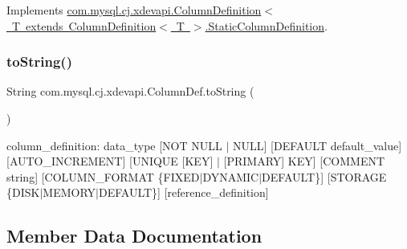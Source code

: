 Implements \mbox{\hyperlink{interfacecom_1_1mysql_1_1cj_1_1xdevapi_1_1_column_definition_1_1_static_column_definition_a0ac0436ab3288cb50a8dd10f4a9c8afc}{com.\+mysql.\+cj.\+xdevapi.\+Column\+Definition$<$ T extends Column\+Definition$<$ T $>$.\+Static\+Column\+Definition}}.

\mbox{\label{classcom_1_1mysql_1_1cj_1_1xdevapi_1_1_column_def_ae26162c5f6538de1eec31032e130593b}} 
\subsubsection{\texorpdfstring{to\+String()}{toString()}}
{\footnotesize\ttfamily String com.\+mysql.\+cj.\+xdevapi.\+Column\+Def.\+to\+String (\begin{DoxyParamCaption}{ }\end{DoxyParamCaption})}

column\+\_\+definition\+: data\+\_\+type \mbox{[}N\+OT N\+U\+LL $\vert$ N\+U\+LL\mbox{]} \mbox{[}D\+E\+F\+A\+U\+LT default\+\_\+value\mbox{]} \mbox{[}A\+U\+T\+O\+\_\+\+I\+N\+C\+R\+E\+M\+E\+NT\mbox{]} \mbox{[}U\+N\+I\+Q\+UE \mbox{[}K\+EY\mbox{]} $\vert$ \mbox{[}P\+R\+I\+M\+A\+RY\mbox{]} K\+EY\mbox{]} \mbox{[}C\+O\+M\+M\+E\+NT \textquotesingle{}string\textquotesingle{}\mbox{]} \mbox{[}C\+O\+L\+U\+M\+N\+\_\+\+F\+O\+R\+M\+AT \{F\+I\+X\+E\+D$\vert$\+D\+Y\+N\+A\+M\+I\+C$\vert$\+D\+E\+F\+A\+U\+LT\}\mbox{]} \mbox{[}S\+T\+O\+R\+A\+GE \{D\+I\+S\+K$\vert$\+M\+E\+M\+O\+R\+Y$\vert$\+D\+E\+F\+A\+U\+LT\}\mbox{]} \mbox{[}reference\+\_\+definition\mbox{]} 

\subsection{Member Data Documentation}
\mbox{\label{classcom_1_1mysql_1_1cj_1_1xdevapi_1_1_column_def_a849fba42478bd67641ab37fd1023aa20}} 
